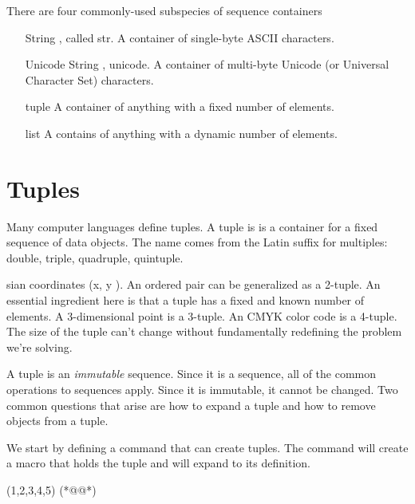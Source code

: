 There are four commonly-used subspecies of sequence containers

\begin{enumerate}
\item[String], called str. A container of single-byte ASCII characters.

\item[Unicode String], unicode. A container of multi-byte Unicode (or Universal Character Set) characters.

\item[tuple] A container of anything with a fixed number of elements.

\item[list] A contains of anything with a dynamic number of elements.
\end{enumerate}

\section{Tuples}

Many computer languages define tuples. A tuple is is a container for a fixed sequence of data objects. The name comes from the Latin suffix for
multiples: double, triple, quadruple, quintuple.

sian
coordinates (x, y ). An ordered pair can be generalized as a 2-tuple.
An essential ingredient here is that a tuple has a fixed and known number of elements. A 3-dimensional point
is a 3-tuple. An CMYK color code is a 4-tuple. The size of the tuple can’t change without fundamentally
redefining the problem we’re solving.

A tuple is an \textit{immutable} sequence. Since it is a sequence, all of the common operations
to sequences apply. Since it is immutable, it cannot be changed. Two common questions that arise are how
to expand a tuple and how to remove objects from a tuple.

We start by defining a command that can create tuples. The command will create a macro that holds the tuple and will expand to its definition.

\begin{teX}
\def\deftuple #1=(#2);{%
  \expandafter\def\csname #1\endcsname{(#2)}
}

\deftuple xy=(1,2,3,4,5);(*@@*)
\end{teX}
\def\deftuple #1=(#2);{%
  \expandafter\def\csname #1\endcsname{(#2)}
}



